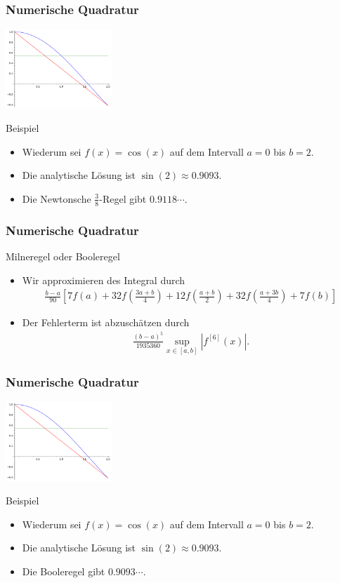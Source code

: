 \documentclass{beamer}
\newcommand\bc[1]{\left({#1}\right)}
\newcommand\brk[1]{\left\lbrack{#1}\right\rbrack}
\renewcommand{\ae}{\"a}
\renewcommand{\oe}{\"o}
\newcommand{\mytitle}{Numerische Quadratur}
\begin{document}
\begin{frame}\frametitle{\mytitle}
	\hfill\includegraphics[height=30mm]{pics/plot_trapez.pdf}
	\begin{block}{Beispiel}
		\begin{itemize}
			\item Wiederum sei $f(x)=\cos(x)$ auf dem Intervall $a=0$ bis $b=2$.
			\item Die analytische L\oe sung ist $\sin(2)\approx0.9093$.
			\item Die Newtonsche $\frac{3}{8}$-Regel gibt $0.9118\cdots$.
		\end{itemize}
	\end{block}
\end{frame}

\begin{frame}\frametitle{\mytitle}
	\begin{block}{Milneregel oder Booleregel}
		\begin{itemize}
			\item Wir approximieren des Integral durch
				\begin{align*}
					\frac{b-a}{90}\brk{7f(a)+32f\bc{\frac{3a+b}{4}}+12f\bc{\frac{a+b}{2}}+32f\bc{\frac{a+3b}{4}}+7f(b)}
				\end{align*}
			\item Der Fehlerterm ist abzusch\ae tzen durch
				\begin{align*}
					\frac{(b-a)^5}{1935360}\sup_{x\in[a,b]}|f^{[6]}(x)|.
				\end{align*}
		\end{itemize}
	\end{block}
\end{frame}

\begin{frame}\frametitle{\mytitle}
	\hfill\includegraphics[height=30mm]{pics/plot_trapez.pdf}
	\begin{block}{Beispiel}
		\begin{itemize}
			\item Wiederum sei $f(x)=\cos(x)$ auf dem Intervall $a=0$ bis $b=2$.
			\item Die analytische L\oe sung ist $\sin(2)\approx0.9093$.
			\item Die Booleregel gibt $0.9093\cdots$.
		\end{itemize}
	\end{block}
\end{frame}
\end{document}
